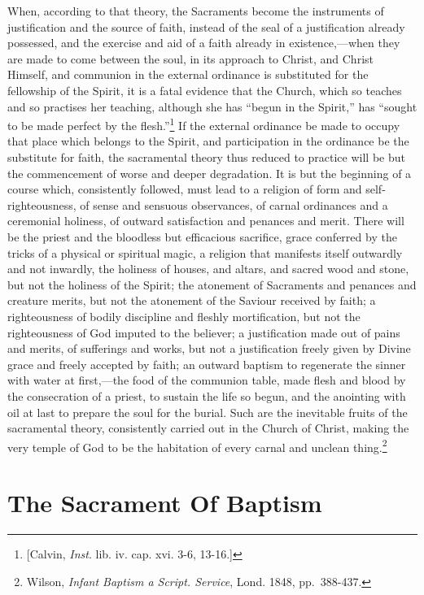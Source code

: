 \documentclass[]{book}
\begin{document}
When, according to that theory, the Sacraments become the instruments of justification and the source of faith, instead of the seal of a justification already possessed, and the exercise and aid of a faith already in existence,---when they are made to come between the soul, in its approach to Christ, and Christ Himself, and communion in the external ordinance is substituted for the fellowship of the Spirit, it is a fatal evidence that the Church, which so teaches and so practises her teaching, although she has ``begun in the Spirit,'' has ``sought to be made perfect by the flesh.''\footnote{{[}Calvin, \emph{Inst}. lib. iv. cap. xvi. 3-6, 13-16.{]}} If the external ordinance be made to occupy that place which belongs to the Spirit, and participation in the ordinance be the substitute for faith, the sacramental theory thus reduced to practice will be but the commencement of worse and deeper degradation. It is but the beginning of a course which, consistently followed, must lead to a religion of form and self-righteousness, of sense and sensuous observances, of carnal ordinances and a ceremonial holiness, of outward satisfaction and penances and merit. There will be the priest and the bloodless but efficacious sacrifice, grace conferred by the tricks of a physical or spiritual magic, a religion that manifests itself outwardly and not inwardly, the holiness of houses, and altars, and sacred wood and stone, but not the holiness of the Spirit; the atonement of Sacraments and penances and creature merits, but not the atonement of the Saviour received by faith; a righteousness of bodily discipline and fleshly mortification, but not the righteousness of God imputed to the believer; a justification made out of pains and merits, of sufferings and works, but not a justification freely given by Divine grace and freely accepted by faith; an outward baptism to regenerate the sinner with water at first,---the food of the communion table, made flesh and blood by the consecration of a priest, to sustain the life so begun, and the anointing with oil at last to prepare the soul for the burial. Such are the inevitable fruits of the sacramental theory, consistently carried out in the Church of Christ, making the very temple of God to be the habitation of every carnal and unclean thing.\footnote{Wilson, \emph{Infant Baptism a Script. Service}, Lond. 1848, pp.~388-437.}

\hypertarget{the-sacrament-of-baptism}{%
\chapter{The Sacrament Of Baptism}\label{the-sacrament-of-baptism}}
\end{document}
